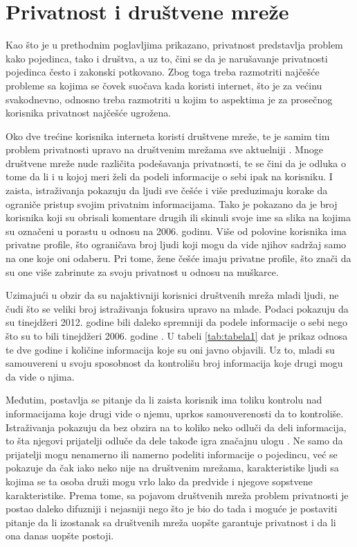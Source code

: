\documentclass[a4paper]{article}
\begin{document}
\section{Privatnost i društvene mreže}
\label{sec:trecePoglavlje}
Kao što je u prethodnim poglavljima prikazano, privatnost predstavlja problem kako pojedinca, tako i društva, a uz to, čini se da je narušavanje privatnosti pojedinca često i zakonski potkovano. Zbog toga treba razmotriti najčešće probleme sa kojima se čovek suočava kada koristi internet, što je za većinu svakodnevno, odnosno treba razmotriti u kojim to aspektima je za prosečnog korisnika privatnost najčešće ugrožena.
\par Oko dve trećine korisnika interneta koristi društvene mreže, te je samim tim problem privatnosti upravo na društvenim mrežama sve aktuelniji \cite{sm1}. Mnoge društvene mreže nude različita podešavanja privatnosti, te se čini da je odluka o tome da li i u kojoj meri želi da podeli informacije o sebi ipak na korisniku. I zaista, istraživanja pokazuju da ljudi sve češće i više preduzimaju korake da ograniče pristup svojim privatnim informacijama. Tako je pokazano da je broj korisnika koji su obrisali komentare drugih ili skinuli svoje ime sa slika na kojima su označeni u porastu u odnosu na 2006. godinu. Više od polovine korisnika ima privatne profile, što ograničava broj ljudi koji mogu da vide njihov sadržaj samo na one koje oni odaberu. Pri tome, žene češće imaju privatne profile, što znači da su one više zabrinute za svoju privatnost u odnosu na muškarce.
\par Uzimajući u obzir da su najaktivniji korisnici društvenih mreža mladi ljudi, ne čudi što se veliki broj istraživanja fokusira upravo na mlade. Podaci pokazuju da su tinejdžeri 2012. godine bili daleko spremniji da podele informacije o sebi nego što su to bili tinejdžeri 2006. godine \cite{sm2}. U tabeli \ref{tab:tabela1} dat je prikaz odnosa te dve godine i količine informacija koje su oni javno objavili. Uz to, mladi su samouvereni u svoju sposobnost da kontrolišu broj informacija koje drugi mogu da vide o njima.
\par Međutim, postavlja se pitanje da li zaista korisnik ima toliku kontrolu nad informacijama koje drugi vide o njemu, uprkos samouverenosti da to kontroliše. Istraživanja pokazuju da bez obzira na to koliko neko odluči da deli informacija, to šta njegovi prijatelji odluče da dele takođe igra značajnu ulogu \cite{sm3}. Ne samo da prijatelji mogu nenamerno ili namerno podeliti informacije o pojedincu, već se pokazuje da čak iako neko nije na društvenim mrežama, karakteristike ljudi sa kojima se ta osoba druži mogu vrlo lako da predvide i njegove sopstvene karakteristike. Prema tome, sa pojavom društvenih mreža problem privatnosti je postao daleko difuzniji i nejasniji nego što je bio do tada i moguće je postaviti pitanje da li izostanak sa društvenih mreža uopšte garantuje privatnost i da li ona danas uopšte postoji.
\\
\end{document}
